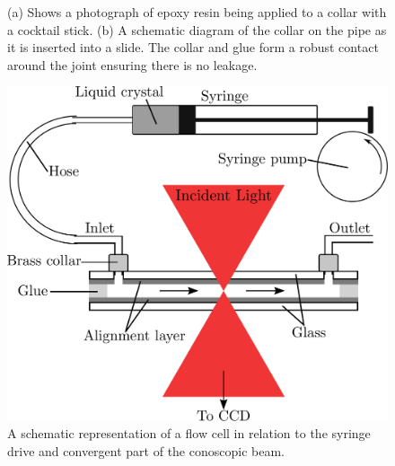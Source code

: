 \begin{figure}
\begin{center}
\hspace{0.5in}
\end{center}
\caption[Flow cell connections]{\label{fig:collar}(a) Shows a photograph of epoxy resin being applied to a collar with a cocktail stick. (b) A schematic diagram of the collar on the pipe as it is inserted into a slide. The collar and glue form a robust contact around the joint ensuring there is no leakage.}
\end{figure}

\begin{figure}
\begin{center}
\includegraphics{Figures/Theory/cell_cono}
\end{center}
\caption[Schematic depiction of flow cell in the conoscope]{\label{fig:conoscope_schem1} A schematic representation of a flow cell in relation to the syringe drive and convergent part of the conoscopic beam.}
\end{figure}

